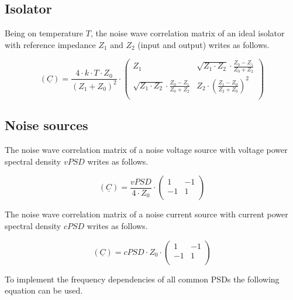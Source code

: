 \documentclass[10pt]{report}
\begin{document}
\subsection{Isolator}

Being on temperature $T$, the noise wave correlation matrix of an
ideal isolator with reference impedance $Z_1$ and $Z_2$ (input and
output) writes as follows.

\begin{equation}
(\underline{C}) = \frac{4\cdot k\cdot T\cdot Z_0}{(Z_1+Z_0)^2}\cdot
\begin{pmatrix}
  Z_1           & \sqrt{Z_1\cdot Z_2}\cdot\frac{Z_0-Z_1}{Z_0+Z_2}\\
  \sqrt{Z_1\cdot Z_2}\cdot\frac{Z_0-Z_1}{Z_0+Z_2} & Z_2\cdot\left(\frac{Z_1-Z_0}{Z_2+Z_0}\right)^2\\
\end{pmatrix}
\end{equation}


\subsection{Noise sources}

The noise wave correlation matrix of a noise voltage source with
voltage power spectral density $vPSD$ writes as follows.

\begin{equation}
(\underline{C}) = \frac{vPSD}{4\cdot Z_0}\cdot
\begin{pmatrix}
   1 & -1\\
  -1 &  1\\
\end{pmatrix}
\end{equation}

The noise wave correlation matrix of a noise current source with
current power spectral density $cPSD$ writes as follows.

\begin{equation}
(\underline{C}) = cPSD\cdot Z_0\cdot
\begin{pmatrix}
   1 & -1\\
  -1 &  1\\
\end{pmatrix}
\end{equation}

To implement the frequency dependencies of all common PSDs the
following equation can be used.
\end{document}
